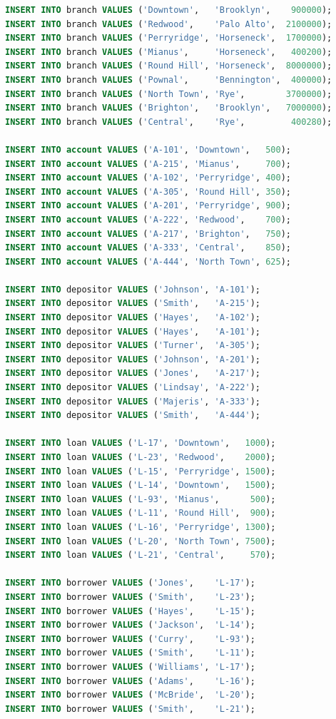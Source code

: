 \documentclass[12pt,a4paper]{article}
\begin{document}
\begin{lstlisting}[language=SQL, caption={lab\_12\_setup.sql}]
INSERT INTO branch VALUES ('Downtown',   'Brooklyn',    900000);
INSERT INTO branch VALUES ('Redwood',    'Palo Alto',  2100000);
INSERT INTO branch VALUES ('Perryridge', 'Horseneck',  1700000);
INSERT INTO branch VALUES ('Mianus',     'Horseneck',   400200);
INSERT INTO branch VALUES ('Round Hill', 'Horseneck',  8000000);
INSERT INTO branch VALUES ('Pownal',     'Bennington',  400000);
INSERT INTO branch VALUES ('North Town', 'Rye',        3700000);
INSERT INTO branch VALUES ('Brighton',   'Brooklyn',   7000000);
INSERT INTO branch VALUES ('Central',    'Rye',         400280);

INSERT INTO account VALUES ('A-101', 'Downtown',   500);
INSERT INTO account VALUES ('A-215', 'Mianus',     700);
INSERT INTO account VALUES ('A-102', 'Perryridge', 400);
INSERT INTO account VALUES ('A-305', 'Round Hill', 350);
INSERT INTO account VALUES ('A-201', 'Perryridge', 900);
INSERT INTO account VALUES ('A-222', 'Redwood',    700);
INSERT INTO account VALUES ('A-217', 'Brighton',   750);
INSERT INTO account VALUES ('A-333', 'Central',    850);
INSERT INTO account VALUES ('A-444', 'North Town', 625);

INSERT INTO depositor VALUES ('Johnson', 'A-101');
INSERT INTO depositor VALUES ('Smith',   'A-215');
INSERT INTO depositor VALUES ('Hayes',   'A-102');
INSERT INTO depositor VALUES ('Hayes',   'A-101');
INSERT INTO depositor VALUES ('Turner',  'A-305');
INSERT INTO depositor VALUES ('Johnson', 'A-201');
INSERT INTO depositor VALUES ('Jones',   'A-217');
INSERT INTO depositor VALUES ('Lindsay', 'A-222');
INSERT INTO depositor VALUES ('Majeris', 'A-333');
INSERT INTO depositor VALUES ('Smith',   'A-444');

INSERT INTO loan VALUES ('L-17', 'Downtown',   1000);
INSERT INTO loan VALUES ('L-23', 'Redwood',    2000);
INSERT INTO loan VALUES ('L-15', 'Perryridge', 1500);
INSERT INTO loan VALUES ('L-14', 'Downtown',   1500);
INSERT INTO loan VALUES ('L-93', 'Mianus',      500);
INSERT INTO loan VALUES ('L-11', 'Round Hill',  900);
INSERT INTO loan VALUES ('L-16', 'Perryridge', 1300);
INSERT INTO loan VALUES ('L-20', 'North Town', 7500);
INSERT INTO loan VALUES ('L-21', 'Central',     570);

INSERT INTO borrower VALUES ('Jones',    'L-17');
INSERT INTO borrower VALUES ('Smith',    'L-23');
INSERT INTO borrower VALUES ('Hayes',    'L-15');
INSERT INTO borrower VALUES ('Jackson',  'L-14');
INSERT INTO borrower VALUES ('Curry',    'L-93');
INSERT INTO borrower VALUES ('Smith',    'L-11');
INSERT INTO borrower VALUES ('Williams', 'L-17');
INSERT INTO borrower VALUES ('Adams',    'L-16');
INSERT INTO borrower VALUES ('McBride',  'L-20');
INSERT INTO borrower VALUES ('Smith',    'L-21');
\end{lstlisting}
\end{document}
